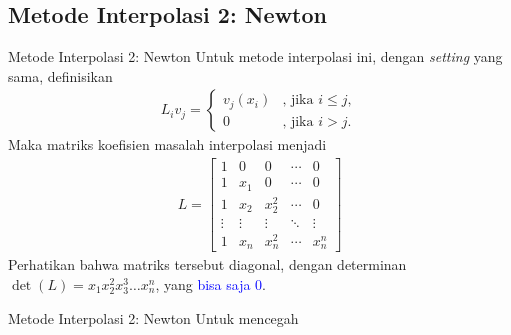 \documentclass[xcolor={dvipsnames}, 9pt]{beamer}
\renewcommand{\emph}[1]{\textcolor{Blue}{#1}}
\begin{document}
    \subsection{Metode Interpolasi 2: Newton}
    \begin{frame}{Metode Interpolasi 2: Newton}
        Untuk metode interpolasi ini, dengan \textit{setting} yang sama, definisikan
        \begin{align*}
            L_iv_j = \begin{cases}
                v_j(x_i) & \text{, jika } i\leq j, \\
                0 & \text{, jika } i>j.
            \end{cases}
        \end{align*}
        Maka matriks koefisien masalah interpolasi menjadi
        \begin{align*}
            L = \begin{bmatrix}
                1 & 0 & 0 & \cdots & 0 \\
                1 & x_1 & 0 & \cdots & 0 \\
                1 & x_2 & x_2^2 & \cdots & 0 \\
                \vdots & \vdots & \vdots & \ddots & \vdots \\
                1 & x_n & x_n^2 & \cdots & x_n^n
            \end{bmatrix}
        \end{align*}
        Perhatikan bahwa matriks tersebut diagonal, dengan determinan $\det(L) = x_1x_2^2x_3^3\dots x_n^n$, yang \emph{bisa saja 0}.
    \end{frame}
    \begin{frame}{Metode Interpolasi 2: Newton}
    	Untuk mencegah 
    \end{frame}
\end{document}
